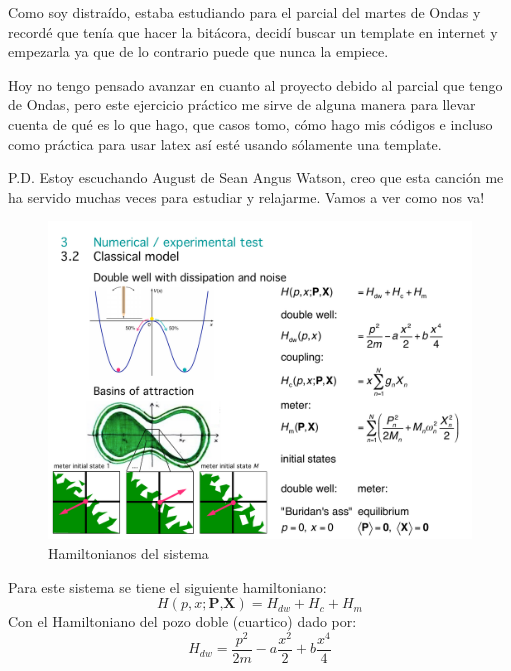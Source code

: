 \documentclass[idxtotoc,hyperref,openany]{labbook} %
\begin{document}
Como soy distraído, estaba estudiando para el parcial del martes de Ondas y recordé que tenía que hacer la bitácora, decidí buscar un template en internet y empezarla ya que de lo contrario puede que nunca la empiece.\par
Hoy no tengo pensado avanzar en cuanto al proyecto debido al parcial que tengo de Ondas, pero este ejercicio práctico me sirve de alguna manera para llevar cuenta de qué es lo que hago, que casos tomo, cómo hago mis códigos e incluso como práctica para usar latex así esté usando sólamente una template.\par
P.D. Estoy escuchando August de Sean Angus Watson, creo que esta canción me ha servido muchas veces para estudiar y relajarme. Vamos a ver como nos va!


\begin{figure}[H] %
\begin{center}
\includegraphics[width=1\linewidth]{clspinmeasmnt.pdf}
\end{center}
\caption{Hamiltonianos del sistema}
\label{fig_hamiltonianos_del_sistema}
\end{figure}

Para este sistema se tiene el siguiente hamiltoniano:
\begin{equation}
H(p,x;\textbf{P,X})=H_{dw}+H_c+H_m
\end{equation}
Con el Hamiltoniano del pozo doble (cuartico) dado por:
\begin{equation}
H_{dw}=\frac{p^2}{2m}-a\frac{x^2}{2}+b\frac{x^4}{4}
\end{equation}
\end{document}
